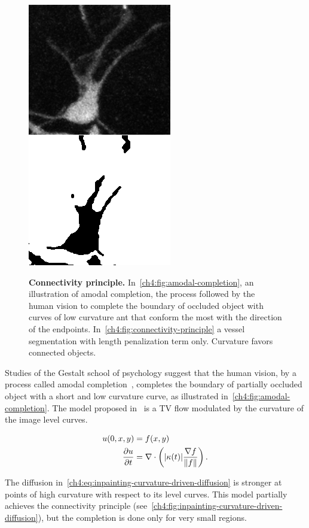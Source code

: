\begin{figure}
{\includegraphics[scale=0.45]{figures/chapter4/vessels-bad-seg.png}
}
\caption{\textbf{Connectivity principle.} In~\cref{ch4:fig:amodal-completion}, an illustration of amodal completion, the process followed by the human vision to complete the boundary of occluded object with curves of low curvature ant that conform the most with the direction of the endpoints. In~\cref{ch4:fig:connectivity-principle} a vessel segmentation with length penalization term only. Curvature favors connected objects.}
\end{figure}

Studies of the Gestalt school of psychology suggest that the human vision, by a process called amodal completion~\cite{mumford94elastica}, completes the boundary of partially occluded object with a short and low curvature curve, as illustrated in~\cref{ch4:fig:amodal-completion}. The model proposed in~\cite{chan01nontexture} is a TV flow modulated by the curvature of the image level curves. 

\begin{align}
	u(0,x,y) &= f(x,y) \nonumber \\
	\frac{\partial u}{\partial t} &= \nabla \cdot \left( |\kappa(t)|\frac{\nabla f}{\lVert f\rVert} \right) .
	\label{ch4:eq:inpainting-curvature-driven-diffusion}
\end{align}

The diffusion in~\cref{ch4:eq:inpainting-curvature-driven-diffusion} is stronger at points of high curvature with respect to its level curves. This model partially achieves the connectivity principle (see~\cref{ch4:fig:inpainting-curvature-driven-diffusion}), but the completion is done only for very small regions. 

